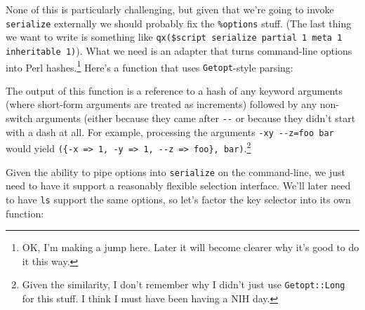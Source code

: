 \documentclass{report}
\begin{document}
    None of this is particularly challenging, but given that we're going to invoke {\tt serialize} externally we should probably fix the \verb|%options| stuff. (The last thing we want to write
    is something like \verb|qx($script serialize partial 1 meta 1 inheritable 1)|). What we need is an adapter that turns command-line options into Perl hashes.\footnote{OK, I'm making a jump
    here. Later it will become clearer why it's good to do it this way.} Here's a function that uses {\tt Getopt}-style parsing:


    The output of this function is a reference to a hash of any keyword arguments (where short-form arguments are treated as increments) followed by any non-switch arguments (either because
    they came after \verb|--| or because they didn't start with a dash at all. For example, processing the arguments \verb|-xy --z=foo bar| would yield
    \verb|({-x => 1, -y => 1, --z => foo}, bar)|.\footnote{Given the similarity, I don't remember why I didn't just use {\tt Getopt::Long} for this stuff. I think I must have been having a NIH
    day.}

    Given the ability to pipe options into {\tt serialize} on the command-line, we just need to have it support a reasonably flexible selection interface. We'll later need to have {\tt ls}
    support the same options, so let's factor the key selector into its own function:
\end{document}
